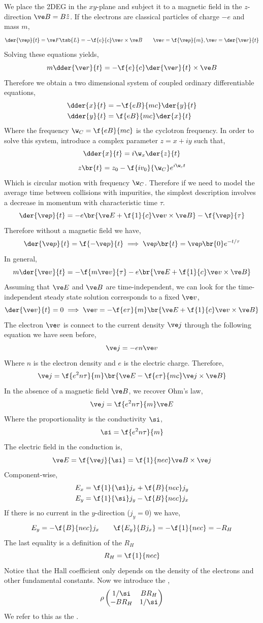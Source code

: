 \documentclass{article}
\begin{document}
We place the 2DEG in the $xy$-plane and subject it to a magnetic field in the $z$-direction $\ve B = B \hat z$. If the electrons are classical particles of charge $-e$ and mass $m$,
\[ \der{\ve p}{t} = \ve F\tsb{L} = - \f{e}{c}\ve v \times \ve B \qquad \ve v = \f{\ve p}{m}, \ve v = \der{\ve r}{t} \]
Solving these equations yields,
\[ m \dder{\ve r}{t} = - \f{e}{c} \der{\ve r}{t} \times \ve B  \]
Therefore we obtain a two dimensional system of coupled ordinary differentiable equations,
\begin{align*}
\dder{x}{t} &= - \f{eB}{mc} \der{y}{t} \\
\dder{y}{t} &= \f{eB}{mc} \der{x}{t}
\end{align*}
Where the frequency $\w_C = \f{eB}{mc}$ is the cyclotron frequency. In order to solve this system, introduce a complex parameter $z = x + i y$ such that,
\[ \dder{x}{t} = i \w_x \der{z}{t} \]
\[ z\br{t} = z_0 - \f{i v_0}{\w_C}e^{i \w_c t}  \]
Which is circular motion with frequency $\w_C$. Therefore if we need to model the average time between collisions with impurities, the simplest description involves a decrease in momentum with characteristic time $\tau$.
\[ \der{\ve p}{t} = - e \br{\ve E + \f{1}{c} \ve v \times \ve B} - \f{\ve p}{\tau} \]
Therefore without a magnetic field we have,
\[ \der{\ve p}{t} = \f{- \ve p}{t} \implies \ve p\br{t} = \ve p\br{0} e^{- t/\tau} \]
In general,
\[ m\der{\ve v}{t} = - \f{m \ve v}{\tau} - e\br{\ve E + \f{1}{c} \ve v \times \ve B} \]
Assuming that $\ve E$ and $\ve B$ are time-independent, we can look for the time-independent steady state solution corresponds to a fixed $\ve v$,
\[ \der{\ve v}{t} = 0 \implies \ve v = -\f{e \tau}{m} \br{\ve E + \f{1}{c} \ve v \times \ve B} \]
The electron $\ve v$ is connect to the current density $\ve j$ through the following equation we have seen before,
\[ \ve j = - e n \ve v \]
Where $n$ is the electron density and $e$ is the electric charge. Therefore,
\[ \ve j = \f{e^2 n \tau}{m} \br{\ve E - \f{e \tau}{m c} \ve j \times \ve B} \]
In the absence of a magnetic field $\ve B$, we recover Ohm's law,
\[ \ve j = \f{e^2 n \tau}{m} \ve E \]
Where the proportionality is the conductivity $\si$,
\[ \si = \f{e^2 n \tau}{m} \]
The electric field in the conduction is,
\[ \ve E = \f{\ve j}{\si} = \f{1}{nec} \ve B \times \ve j \]
Component-wise,
\begin{align*}
    E_x &= \f{1}{\si} j_x + \f{B}{nec} j_y \\
    E_y &= \f{1}{\si} j_y - \f{B}{nec} j_x
\end{align*}
If there is no current in the $y$-direction ($j_y = 0$) we have,
\[ E_y = -\f{B}{nec} j_x \qquad \f{E_y}{B j_x} = -\f{1}{nec} = - R_H \]
The last equality is a definition of the  $R_H$
\[ R_H = \f{1}{nec} \]
Notice that the Hall coefficient only depends on the density of the electrons and other fundamental constants. Now we introduce the ,
\[\rho \begin{pmatrix}
    1 / \si & B R_{H} \\
    -B R_{H} & 1 / \si \\
\end{pmatrix} \]
We refer to this as the .
\end{document}
